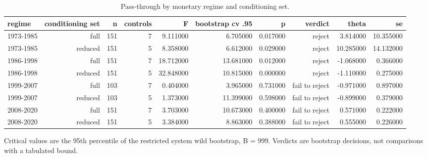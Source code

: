 \begin{table}[htbp]
\centering
\caption{Pass-through by monetary regime and conditioning set.}
\label{tab:tab07_regimes}
\begin{threeparttable}
\begin{tabular}{lrrrrrrrrr}
\toprule
regime & conditioning set & n & controls & F & bootstrap cv .95 & p & verdict & theta & se \\
\midrule
1973-1985 & full & 151 & 7 & 9.111000 & 6.705000 & 0.017000 & reject & 3.814000 & 10.355000 \\
1973-1985 & reduced & 151 & 5 & 8.358000 & 6.612000 & 0.029000 & reject & 10.285000 & 14.132000 \\
1986-1998 & full & 151 & 7 & 18.712000 & 13.681000 & 0.012000 & reject & -1.068000 & 0.366000 \\
1986-1998 & reduced & 151 & 5 & 32.848000 & 10.815000 & 0.000000 & reject & -1.110000 & 0.275000 \\
1999-2007 & full & 103 & 7 & 0.404000 & 3.965000 & 0.731000 & fail to reject & -0.971000 & 0.897000 \\
1999-2007 & reduced & 103 & 5 & 1.373000 & 11.399000 & 0.598000 & fail to reject & -0.899000 & 0.379000 \\
2008-2020 & full & 151 & 7 & 3.703000 & 10.673000 & 0.400000 & fail to reject & 0.571000 & 0.222000 \\
2008-2020 & reduced & 151 & 5 & 3.384000 & 8.863000 & 0.388000 & fail to reject & 0.555000 & 0.226000 \\
\bottomrule
\end{tabular}

\begin{tablenotes}[flushleft]\small
\item Critical values are the 95th percentile of the restricted system wild bootstrap, B = 999. Verdicts are bootstrap decisions, not comparisons with a tabulated bound.
\end{tablenotes}
\end{threeparttable}
\end{table}